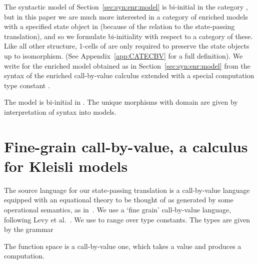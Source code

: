 \documentclass{LMCS}
\begin{document}
The syntactic model of Section~\ref{sec:syn:enr:model} is bi-initial in the category , but in this paper
we are much more interested in a category of enriched models   
with a specified state object  in  (because of the relation to the state-passing
translation), and so we formulate bi-initiality with respect to a category 
 of these. Like all other structure, 1-cells of  are 
only required to preserve the state objects up to isomorphism. (See Appendix~\ref{app:CATECBV} 
for a full definition). We write  for the enriched model 
obtained as in Section~\ref{sec:syn:enr:model} from the syntax of the enriched call-by-value calculus
extended with a special computation type constant .

\begin{thm} \label{thm:ecbv:biinitial}
The model  is bi-initial in . The unique 
morphisms with domain  are given by interpretation of syntax into models.
\end{thm}





\section{Fine-grain call-by-value, a calculus for Kleisli models}
\label{sec:fgcbv}

The source language for our state-passing translation is a call-by-value language equipped with an equational theory to be thought of as generated by some operational semantics, as in~\cite{Plotkin:65}. 
We use a `fine grain' call-by-value language, 
following Levy et al.~\cite{Levy:03,Levy:book}.
We use  to range over type constants. The types are given by the grammar

The function space  is a call-by-value
one, which takes a value and produces a computation. 
\end{document}
